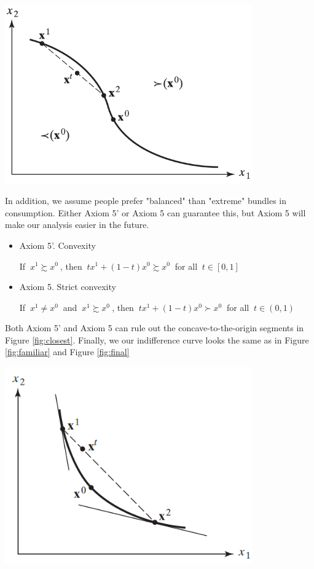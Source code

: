 \documentclass{article}
\begin{document}
\begin{mdframed}[backgroundcolor=blue!20,linecolor=white]
{\centering
\includegraphics[width=0.8\textwidth]{1.closest}
\label{fig:closest}}
\vspace{2mm}

In addition, we assume people prefer "balanced" than "extreme" bundles in consumption.
Either Axiom 5' or Axiom 5 can guarantee this, but Axiom 5 will make our analysis easier in the future.

\begin{itemize}

\item Axiom 5'. Convexity

If $\ x^1 \succsim x^0 \ $, then $\ tx^1 + (1-t)x^0 \succsim x^0 \ $ for all $\ t \in [0,1]$

\item Axiom 5. Strict convexity

If $\ x^1 \ne x^0 \ $ and $\ x^1 \succsim x^0 \ $, then $\ tx^1 + (1-t)x^0 \succ x^0 \ $ for all $\ t \in (0,1)$

\end{itemize}

Both Axiom 5' and Axiom 5 can rule out the concave-to-the-origin segments in Figure \ref{fig:closest}.
Finally, we our indifference curve looks the same as in Figure \ref{fig:familiar} and Figure \ref{fig:final}

\vspace{2mm}

{\centering
\includegraphics[width=0.8\textwidth]{1.final}
\label{fig:final}}


\end{mdframed}
\end{document}
